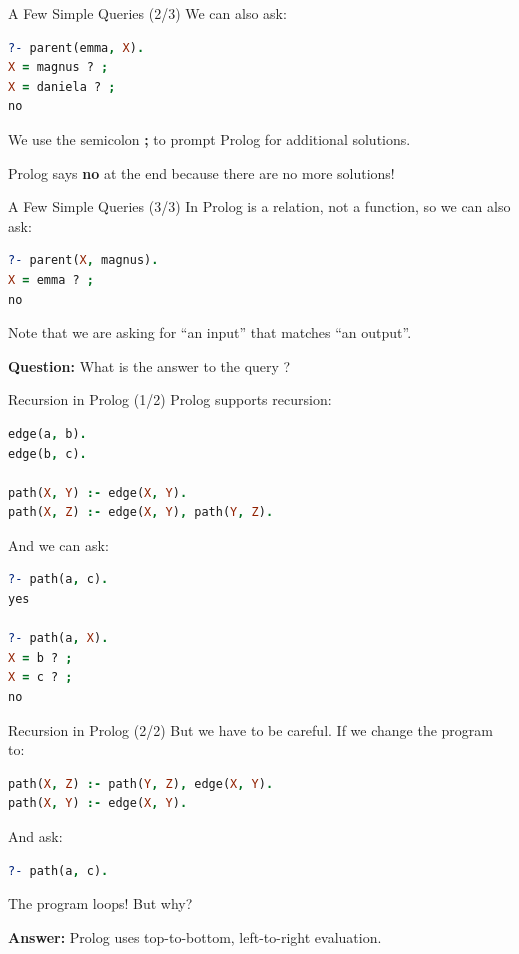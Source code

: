 \begin{frame}[fragile]{A Few Simple Queries (2/3)}
We can also ask:

\begin{lstlisting}[language=prolog, xleftmargin=0.5cm]
?- parent(emma, X).
X = magnus ? ;
X = daniela ? ;
no
\end{lstlisting}

We use the semicolon \textbf{;} to prompt Prolog for additional solutions.

Prolog says \textbf{no} at the end because there are no more solutions!
\end{frame}

\begin{frame}[fragile]{A Few Simple Queries (3/3)}
In Prolog  is a relation, not a function, so we can also ask:

\begin{lstlisting}[language=prolog, xleftmargin=0.5cm]
?- parent(X, magnus).
X = emma ? ;
no
\end{lstlisting}

Note that we are asking for ``an input'' that matches ``an output''.

\pause

\textbf{Question:} What is the answer to the query ?
\end{frame}

\begin{frame}[fragile]{Recursion in Prolog (1/2)}
Prolog supports recursion:

\begin{lstlisting}[language=prolog, xleftmargin=0.5cm]
edge(a, b).
edge(b, c).

path(X, Y) :- edge(X, Y).
path(X, Z) :- edge(X, Y), path(Y, Z).
\end{lstlisting}

And we can ask:

\begin{lstlisting}[language=prolog, xleftmargin=0.5cm]
?- path(a, c).
yes

?- path(a, X).
X = b ? ;
X = c ? ;
no
\end{lstlisting}
\end{frame}

\begin{frame}[fragile]{Recursion in Prolog (2/2)}
But we have to be careful. If we change the program to:

\begin{lstlisting}[language=prolog, xleftmargin=0.5cm]
path(X, Z) :- path(Y, Z), edge(X, Y).
path(X, Y) :- edge(X, Y).
\end{lstlisting}

And ask:

\begin{lstlisting}[language=prolog, xleftmargin=0.5cm]
?- path(a, c).
\end{lstlisting}

\pause

The program loops! But why?

\pause

\textbf{Answer:} Prolog uses top-to-bottom, left-to-right evaluation.
\end{frame}

